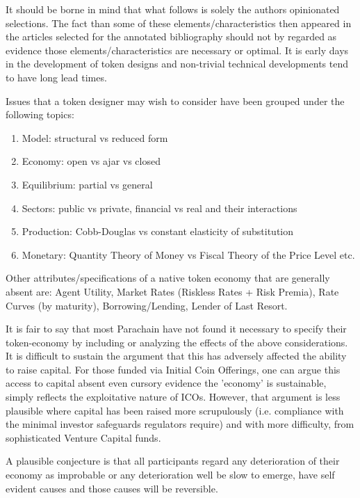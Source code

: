 \documentclass[11pt]{article}
\begin{document}
It should be borne in mind that what follows is solely the authors opinionated selections. The fact than some of these elements/characteristics then appeared in the articles selected for the annotated bibliography should not by regarded as evidence those elements/characteristics are necessary or optimal.  It is early days in the development of token designs and non-trivial technical developments tend to have long lead times.

Issues that a token designer may wish to consider have been grouped under the following topics:

\begin{enumerate}
    \item[] Model: structural vs reduced form
    \item[] Economy: open vs ajar vs closed
    \item[] Equilibrium: partial vs general
    \item[] Sectors: public vs private, financial vs real and their interactions
    \item[] Production: Cobb-Douglas vs constant elasticity of substitution
    \item[] Monetary: Quantity Theory of Money vs Fiscal Theory of the Price Level etc.
\end{enumerate}

Other attributes/specifications of a native token economy that are generally absent are: Agent Utility, Market Rates (Riskless Rates + Risk Premia), Rate Curves (by maturity), Borrowing/Lending, Lender of Last Resort.

It is fair to say that most Parachain have not found it necessary to specify their token-economy by including or analyzing the effects of the above considerations. 
It is difficult to sustain the argument that this has adversely affected the ability to raise capital. For those funded via Initial Coin Offerings, one can argue this access to capital absent even cursory evidence the 'economy' is sustainable, simply reflects the exploitative nature of ICOs. However, that argument is less plausible where capital has been raised more scrupulously (i.e. compliance with the minimal investor safeguards regulators require) and with more difficulty, from sophisticated Venture Capital funds.

A plausible conjecture is that all participants regard any deterioration of their economy as improbable or any deterioration well be slow to emerge, have self evident causes and those causes will be reversible.
\end{document}
